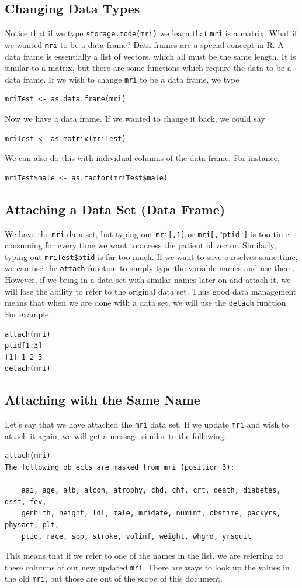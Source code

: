 \documentclass[11pt,letterpaper,fleqn]{report}
\begin{document}
\subsection{Changing Data Types}
Notice that if we type \texttt{storage.mode(mri)} we learn that \texttt{mri} is a matrix. What if we wanted \texttt{mri} to be a data frame? Data frames are a special concept in R. A data frame is essentially a list of vectors, which all must be the same length. It is similar to a matrix, but there are some functions which require the data to be a data frame. If we wish to change \texttt{mri} to be a data frame, we type 
\begin{verbatim}
mriTest <- as.data.frame(mri)
\end{verbatim}
Now we have a data frame. If we wanted to change it back, we could say \begin{verbatim}mriTest <- as.matrix(mriTest) \end{verbatim}
We can also do this with individual columns of the data frame. For instance, 
\begin{verbatim}
mriTest$male <- as.factor(mriTest$male)
\end{verbatim}
\subsection{Attaching a Data Set (Data Frame)}
We have the \texttt{mri} data set, but typing out \texttt{mri[,1]} or \texttt{mri[,"ptid"]} is too time consuming for every time we want to access the patient id vector. Similarly, typing out \texttt{mriTest\$ptid} is far too much. If we want to save ourselves some time, we can use the \texttt{attach} function to simply type the variable names and use them. However, if we bring in a data set with similar names later on and attach it, we will lose the ability to refer to the original data set. Thus good data management means that when we are done with a data set, we will use the \texttt{detach} function. For example, 
\begin{verbatim}
attach(mri)
ptid[1:3]
[1] 1 2 3
detach(mri)
\end{verbatim}
\subsection{Attaching with the Same Name}
Let's say that we have attached the \texttt{mri} data set. If we update \texttt{mri} and wish to attach it again, we will get a message similar to the following:
\begin{verbatim}
attach(mri)
The following objects are masked from mri (position 3):

    aai, age, alb, alcoh, atrophy, chd, chf, crt, death, diabetes, dsst, fev,
    genhlth, height, ldl, male, mridate, numinf, obstime, packyrs, physact, plt,
    ptid, race, sbp, stroke, volinf, weight, whgrd, yrsquit
\end{verbatim}
This means that if we refer to one of the names in the list, we are referring to these columns of our new updated \texttt{mri}. There are ways to look up the values in the old \texttt{mri}, but those are out of the scope of this document.
\end{document}
